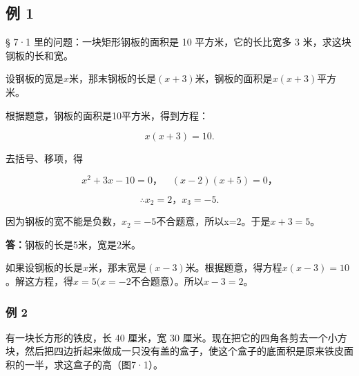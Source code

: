 \subsection{例 1}

§ 7·1 里的问题：一块矩形钢板的面积是 10 平方米，它的长比宽多 3
米，求这块钢板的长和宽。

设钢板的宽是\(x\)米，那末钢板的长是\((x + 3)\)米，钢板的面积是\(x(x + 3)\)平方米。

根据题意，钢板的面积是10平方米，得到方程：

\[
x (x + 3) = 10.
\]

去括号、移项，得

\[
x ^ {2} + 3 x - 10 = 0\text{，} \quad (x - 2) (x + 5) = 0\text{，}
\]

\[
\therefore x _ {2} = 2\text{，} x _ {3} = - 5.
\]

因为钢板的宽不能是负数，\(x_{2}=-5\)不合题意，所以x=2。于是\(x+3=5\)。

\textbf{答：}钢板的长是5米，宽是2米。

如果设钢板的长是\(x\)米，那末宽是\((x - 3)\)米。根据题意，得方程\(x(x - 3) = 10\)。解这方程，得\(x = 5(x = -2\)不合题意）。所以\(x - 3 = 2\)。

\subsubsection{例 2}

有一块长方形的铁皮，长 40 厘米，宽 30
厘米。现在把它的四角各剪去一个小方块，然后把四边折起来做成一只没有盖的盒子，使这个盒子的底面积是原来铁皮面积的一半，求这盒子的高（图7·1）。

